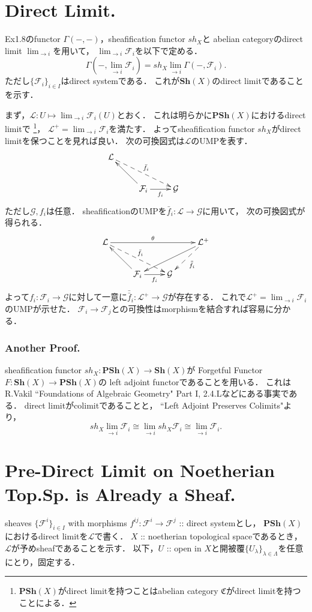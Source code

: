 \documentclass[a4paper]{jsarticle}
\newcommand{\shF}{\mathcal{F}}
\newcommand{\shG}{\mathcal{G}}
\newcommand{\shL}{\mathcal{L}}
\newcommand{\Sh}{\mathbf{Sh}}
\newcommand{\PSh}{\mathbf{PSh}}
\begin{document}
\section{Direct Limit.} %
    Ex1.8のfunctor $\Gamma(-,-)$，sheafification functor $sh_X$と
    abelian categoryのdirect limit $\lim_{\to i}$を用いて，
    $\lim_{\to i}\shF_i$を以下で定める．
    \[ \Gamma(-,\lim_{\to i}\shF_i)=sh_X \lim_{\to i} \Gamma(-,\shF_i). \]
    ただし$\{\shF_i\}_{i \in I}$はdirect systemである．
    これが$\Sh(X)$のdirect limitであることを示す．

    まず，$\shL: U \mapsto \lim_{\to i} \shF_i(U)$とおく．
    これは明らかに$\PSh(X)$におけるdirect limitで
    \footnote{$\PSh(X)$がdirect limitを持つことはabelian category $\mathfrak{C}$がdirect limitを持つことによる．}，
    $\shL^+=\lim_{\to i}\shF_i$を満たす．
    よってsheafification functor $sh_X$がdirect limitを保つことを見れば良い．
    次の可換図式は$\shL$のUMPを表す．
    \[
    \xymatrix
    {
        \shL \ar@{-->}[rrd]^-{\bar{f}_i}& {} & {} & {} \\
        {} & \shF_i \ar[r]_-{f_i} \ar[lu] & \shG & {}
    }
    \]
    ただし$\shG, f_i$は任意．
    sheafificationのUMPを$\bar{f}_i: \shL \to \shG$に用いて，
    次の可換図式が得られる．
    \[
    \xymatrix
    {
    \shL \ar@{-->}[rrd]^-{\bar{f}_i} \ar[rrr]^-{\theta}& {} & {} & \shL^+ \ar[lld] \ar@{-->}[ld]^-{\bar{\bar{f}}_i}\\
        {} & \shF_i \ar[r]_-{f_i} \ar[lu] & \shG & {}
    }
    \]
    よって$f_i:\shF_i \to \shG$に対して一意に$\bar{\bar{f}}_i: \shL^+ \to \shG$が存在する．
    これで$\shL^+=\lim_{\to i}\shF_i$のUMPが示せた．
    $\shF_i \to \shF_j$との可換性はmorphismを結合すれば容易に分かる．

    \subsubsection{Another Proof.} \label{sssec:1-10-1}
    sheafification functor $sh_X: \PSh(X) \to \Sh(X)$が
    Forgetful Functor $F: \Sh(X) \to \PSh(X)$の
    left adjoint functorであることを用いる．
    これはR.Vakil ``Foundations of Algebraic Geometry" Part I, 2.4.Lなどにある事実である．
    direct limitがcolimitであることと，
    ``Left Adjoint Preserves Colimits"より，
    \[ sh_X \lim_{\to i} \shF_i \cong \lim_{\to i} sh_X \shF_i \cong \lim_{\to i} \shF_i. \]

\section{Pre-Direct Limit on Noetherian Top.Sp. is Already a Sheaf.} %
sheaves $\{\shF^i\}_{i \in I}$ with morphisms $f^{ij}: \shF^i \to \shF^j$ :: direct systemとし，
    $\PSh(X)$におけるdirect limitを$\shL$で書く．
    $X$ :: noetherian topological spaceであるとき，$\shL$が予めsheafであることを示す．
    以下，$U$ :: open in $X$と開被覆$\{U_{\lambda}\}_{\lambda \in \Lambda}$を任意にとり，固定する．
\end{document}
